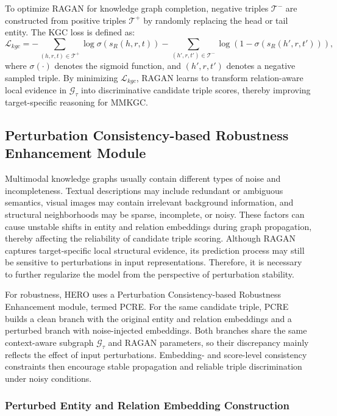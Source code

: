 \documentclass[a4paper,fleqn]{cas-sc}
\begin{document}
To optimize RAGAN for knowledge graph completion, negative triples $\mathcal{T}^{-}$ are constructed from positive triples $\mathcal{T}^{+}$ by randomly replacing the head or tail entity. The KGC loss is defined as:
\begin{equation}
\mathcal{L}_{kgc}
=
-\sum_{(h,r,t)\in\mathcal{T}^{+}}
\log
\sigma
\left(
s_{R}(h,r,t)
\right)
-
\sum_{(h',r,t')\in\mathcal{T}^{-}}
\log
\left(
1-
\sigma
\left(
s_{R}(h',r,t')
\right)
\right),
\end{equation}
where $\sigma(\cdot)$ denotes the sigmoid function, and $(h',r,t')$ denotes a negative sampled triple. By minimizing $\mathcal{L}_{kgc}$, RAGAN learns to transform relation-aware local evidence in $\mathcal{G}_{\tau}$ into discriminative candidate triple scores, thereby improving target-specific reasoning for MMKGC.

\subsection{Perturbation Consistency-based Robustness Enhancement Module}

Multimodal knowledge graphs usually contain different types of noise and incompleteness. Textual descriptions may include redundant or ambiguous semantics, visual images may contain irrelevant background information, and structural neighborhoods may be sparse, incomplete, or noisy. These factors can cause unstable shifts in entity and relation embeddings during graph propagation, thereby affecting the reliability of candidate triple scoring. Although RAGAN captures target-specific local structural evidence, its prediction process may still be sensitive to perturbations in input representations. Therefore, it is necessary to further regularize the model from the perspective of perturbation stability.

For robustness, HERO uses a Perturbation Consistency-based Robustness Enhancement module, termed PCRE. For the same candidate triple, PCRE builds a clean branch with the original entity and relation embeddings and a perturbed branch with noise-injected embeddings. Both branches share the same context-aware subgraph $\mathcal{G}_{\tau}$ and RAGAN parameters, so their discrepancy mainly reflects the effect of input perturbations. Embedding- and score-level consistency constraints then encourage stable propagation and reliable triple discrimination under noisy conditions.

\subsubsection{Perturbed Entity and Relation Embedding Construction}
\end{document}
